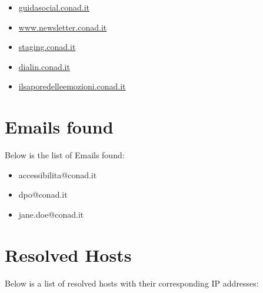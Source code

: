 \documentclass{article}
\begin{document}
\begin{itemize}
        
        
        \item \href{ https://guidasocial.conad.it/ }{ guidasocial.conad.it }
    
        
        
        \item \href{ https://www.newsletter.conad.it/ }{ www.newsletter.conad.it }
    
        
        
        \item \href{ http://staging.conad.it/ }{ staging.conad.it }
    
        
        
        \item \href{ https://dialin.conad.it/ }{ dialin.conad.it }
    
        
        
        \item \href{ http://ilsaporedelleemozioni.conad.it/ }{ ilsaporedelleemozioni.conad.it }
    
\end{itemize}


\section*{Emails found}

Below is the list of Emails found:

\begin{itemize}
    
        \item accessibilita@conad.it
    
        \item dpo@conad.it
    
        \item jane.doe@conad.it
    
\end{itemize}

\section*{Resolved Hosts}

Below is a list of resolved hosts with their corresponding IP addresses:
\end{document}
